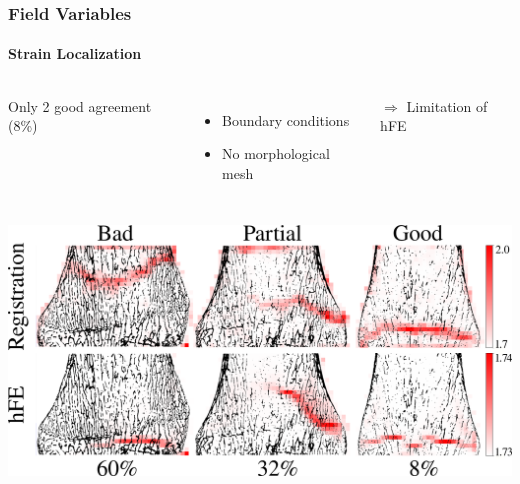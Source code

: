\documentclass[xcolor=table,11pt]{beamer}
\begin{document}

	\begin{frame}
		\frametitle{Field Variables}
		\framesubtitle{Strain Localization}
		\begin{columns}
			Only 2 good agreement (8\%)
				\begin{itemize}
					\item Boundary conditions
					\item No morphological mesh
				\end{itemize}

				$\Rightarrow$ Limitation of hFE	
		\end{columns}

		\vspace{0.5cm}
		\centering
		\includegraphics[width=0.8\linewidth]{Figures/Comparison}
	\end{frame}

	
\end{document}
